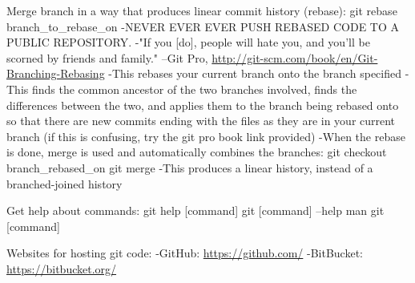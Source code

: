 \documentclass[12pt]{article}
\begin{document}
Merge branch in a way that produces linear commit history (rebase):
git rebase branch{\_}to{\_}rebase{\_}on
-NEVER EVER EVER PUSH REBASED CODE TO A PUBLIC REPOSITORY.
    -"If you [do], people will hate you, and you’ll be scorned by friends and
     family." --Git Pro, \url{http://git-scm.com/book/en/Git-Branching-Rebasing}
-This rebases your current branch onto the branch specified
-This finds the common ancestor of the two branches involved, finds the
    differences between the two, and applies them to the branch being rebased
    onto so that there are new commits ending with the files as they are in your
    current branch (if this is confusing, try the git pro book link provided)
-When the rebase is done, merge is used and automatically combines the branches:
    git checkout branch{\_}rebased{\_}on
    git merge
-This produces a linear history, instead of a branched-joined history
    
Get help about commands:
git help [command]
git [command] --help
man git [command]


Websites for hosting git code:
-GitHub: \url{https://github.com/}
-BitBucket: \url{https://bitbucket.org/}
\end{document}
